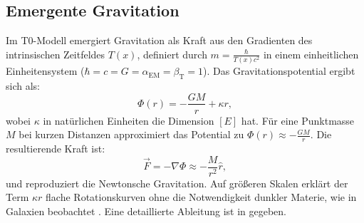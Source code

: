 \documentclass[12pt,a4paper]{article}
\newcommand{\Tfield}{T(x)}
\newcommand{\betaT}{\beta_{\text{T}}}
\newcommand{\alphaEM}{\alpha_{\text{EM}}}
\begin{document}
	\subsection{Emergente Gravitation}
	Im T0-Modell emergiert Gravitation als Kraft aus den Gradienten des intrinsischen Zeitfeldes \(\Tfield\), definiert durch \( m = \frac{\hbar}{\Tfield c^2} \) in einem einheitlichen Einheitensystem (\(\hbar = c = G = \alphaEM = \betaT = 1\)). Das Gravitationspotential ergibt sich als:
	\begin{equation}
		\Phi(r) = -\frac{G M}{r} + \kappa r,
	\end{equation}
	wobei \(\kappa\) in natürlichen Einheiten die Dimension \([E]\) hat. Für eine Punktmasse \(M\) bei kurzen Distanzen approximiert das Potential zu \(\Phi(r) \approx -\frac{GM}{r}\). Die resultierende Kraft ist:
	\begin{equation}
		\vec{F} = -\nabla \Phi \approx -\frac{M}{r^2} \hat{r},
	\end{equation}
	und reproduziert die Newtonsche Gravitation. Auf größeren Skalen erklärt der Term \(\kappa r\) flache Rotationskurven ohne die Notwendigkeit dunkler Materie, wie in Galaxien beobachtet \cite{rubin1980, McGaugh2016}. Eine detaillierte Ableitung ist in \cite{pascher_emergente_gravitation_2025, pascher_alphabeta_2025} gegeben.
	
\end{document}
